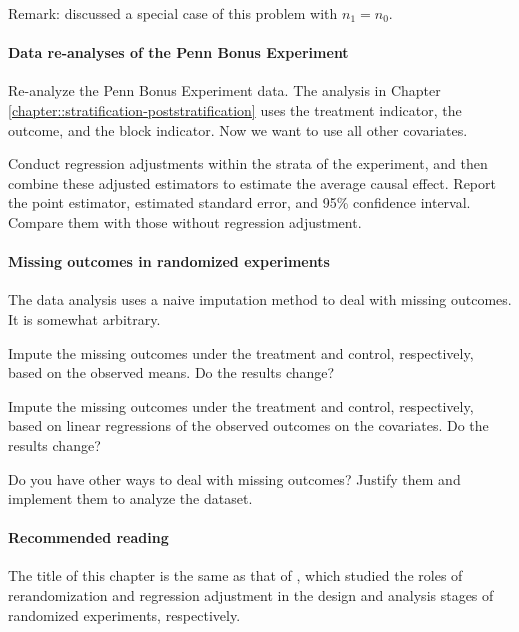 Remark: \citet[][page 28]{gerber2012field} discussed a special case  of this problem with $n_1=n_0.$



\paragraph{Data re-analyses of the Penn Bonus Experiment}

 
Re-analyze the Penn Bonus Experiment data. The analysis in Chapter \ref{chapter::stratification-poststratification} uses the treatment indicator, the outcome, and the block indicator. Now we want to use all other covariates. 

Conduct regression adjustments within the strata of the experiment, and then combine these adjusted estimators to estimate the average causal effect. Report the point estimator, estimated standard error, and 95\% confidence interval. Compare them with those without regression adjustment. 
 

\paragraph{Missing outcomes in randomized experiments}\label{hw::missing-y-experiments}

The data analysis uses a naive imputation method to deal with missing outcomes. It is somewhat arbitrary. 

Impute the missing outcomes under the treatment and control, respectively,  based on the observed means. Do the results change?

Impute the missing outcomes under the treatment and control, respectively, based on linear regressions of the observed outcomes on the covariates. Do the results change? 

Do you have other ways to deal with missing outcomes? Justify them and implement them to analyze the dataset. 




\paragraph{Recommended reading}

The title of this chapter is the same as that of \citet{li2019rerandomization}, which studied the roles of rerandomization and regression adjustment in the design and analysis stages of randomized experiments, respectively. 


